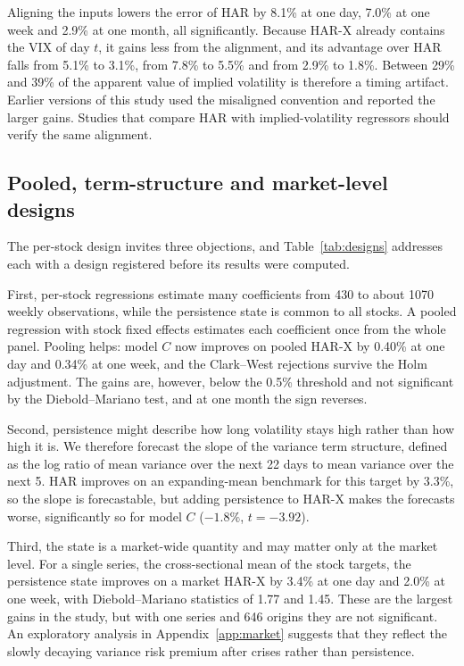 

Aligning the inputs lowers the error of HAR by 8.1\% at one day, 7.0\% at one
week and 2.9\% at one month, all significantly. Because HAR-X already
contains the VIX of day $t$, it gains less from the alignment, and its
advantage over HAR falls from 5.1\% to 3.1\%, from 7.8\% to 5.5\% and from
2.9\% to 1.8\%. Between 29\% and 39\% of the apparent value of implied
volatility is therefore a timing artifact. Earlier versions of this study
used the misaligned convention and reported the larger gains. Studies that
compare HAR with implied-volatility regressors should verify the same
alignment.

\subsection{Pooled, term-structure and market-level designs}

The per-stock design invites three objections, and Table~\ref{tab:designs}
addresses each with a design registered before its results were computed.



First, per-stock regressions estimate many coefficients from 430 to about
1070 weekly observations, while the persistence state is common to all
stocks. A pooled regression with stock fixed effects estimates each
coefficient once from the whole panel. Pooling helps: model $C$ now improves
on pooled HAR-X by 0.40\% at one day and 0.34\% at one week, and the
Clark--West rejections survive the Holm adjustment. The gains are, however,
below the 0.5\% threshold and not significant by the Diebold--Mariano test,
and at one month the sign reverses.

Second, persistence might describe how long volatility stays high rather
than how high it is. We therefore forecast the slope of the variance term
structure, defined as the log ratio of mean variance over the next 22 days
to mean variance over the next 5. HAR improves on an expanding-mean
benchmark for this target by 3.3\%, so the slope is forecastable, but adding
persistence to HAR-X makes the forecasts worse, significantly so for model
$C$ ($-1.8\%$, $t=-3.92$).

Third, the state is a market-wide quantity and may matter only at the market
level. For a single series, the cross-sectional mean of the stock targets,
the persistence state improves on a market HAR-X by 3.4\% at one day and 2.0\%
at one week, with Diebold--Mariano statistics of 1.77 and 1.45. These are
the largest gains in the study, but with one series and 646 origins they are
not significant. An exploratory analysis in Appendix~\ref{app:market}
suggests that they reflect the slowly decaying variance risk premium after
crises rather than persistence.

